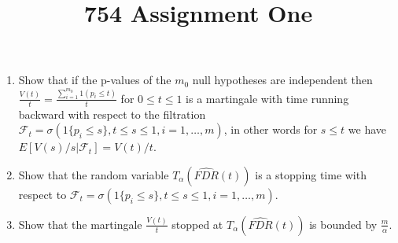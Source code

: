 \documentclass[12pt]{article}
\begin{document}
\title{754 Assignment One}


\begin{enumerate}
\item Show that  if the p-values of the $m_0$ null hypotheses are independent then $\frac{V(t)}{t} = \frac{\sum_{i=1}^{m_0} 1(p_i \leq t)}{t}$ for $0 \leq t \leq 1$ is a martingale with time running backward with respect to the filtration $\mathcal{F}_t = \sigma(1\{p_i \leq s\}, t \leq s \leq 1,i=1,\ldots,m)$, in other words for $s \leq t$ we have $E[V(s)/s | \mathcal{F}_t] = V(t)/t$. 
\item Show that the random variable $T_{\alpha}(\widehat{FDR}(t))$ is a stopping time with respect to $\mathcal{F}_t = \sigma(1\{p_i \leq s\}, t \leq s \leq 1,i=1,\ldots,m)$. 
\item Show that the martingale $\frac{V(t)}{t}$ stopped at $T_{\alpha}(\widehat{FDR}(t))$ is bounded by $\frac{m}{\alpha}$. 
\end{enumerate}





%



\end{document}
